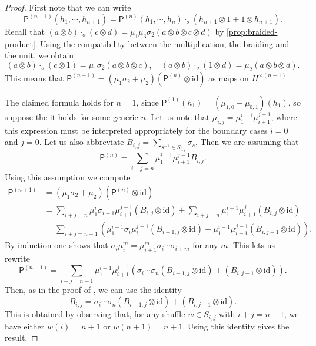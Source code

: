 \documentclass[a4paper, 12pt, reqno, english]{amsart}
\numberwithin{equation}{section}
\numberwithin{figure}{section}
\theoremstyle{plain}
\theoremstyle{plain}
\theoremstyle{plain}
\theoremstyle{plain}
\theoremstyle{plain}
\theoremstyle{definition}
\theoremstyle{definition}
\theoremstyle{definition}
\theoremstyle{remark}
\theoremstyle{definition}
\theoremstyle{definition}
\newcommand{\id}{\mathrm{id}}
\newcommand{\pmap}{\mathsf{P}}
\begin{document}
\begin{proof}
First note that we can write
\[
\pmap^{(n + 1)} (h_1, \cdots, h_{n + 1}) = \pmap^{(n)}(h_1, \cdots, h_n) \cdot_\sigma (h_{n + 1} \otimes 1 + 1 \otimes h_{n + 1}).
\]
Recall that $(a \otimes b) \cdot_\sigma (c \otimes d) = \mu_1 \mu_3 \sigma_2 (a \otimes b \otimes c \otimes d)$ by \cref{prop:braided-product}.
Using the compatibility between the multiplication, the braiding and the unit, we obtain
\[
(a \otimes b) \cdot_\sigma (c \otimes 1) = \mu_1 \sigma_2 (a \otimes b \otimes c), \quad
(a \otimes b) \cdot_\sigma (1 \otimes d) = \mu_2 (a \otimes b \otimes d).
\]
This means that $\pmap^{(n + 1)} = (\mu_1 \sigma_2 + \mu_2)(\pmap^{(n)} \otimes \id)$ as maps on $H^{\times (n + 1)}$.

The claimed formula holds for $n = 1$, since $\pmap^{(1)}(h_1) = (\mu_{1, 0} + \mu_{0, 1})(h_1)$, so suppose the it holds for some generic $n$.
Let us note that $\mu_{i, j} = \mu_1^{i - 1} \mu_{i + 1}^{j - 1}$, where this expression must be interpreted appropriately for the boundary cases $i = 0$ and $j = 0$.
Let us also abbreviate $B_{i, j} = \sum_{s^{-1} \in S_{i, j}} \sigma_s$.
Then we are assuming that
\[
\pmap^{(n)} = \sum_{i + j = n} \mu_1^{i - 1} \mu_{i + 1}^{j - 1} B_{i, j}.
\]
Using this assumption we compute
\[
\begin{split}
\pmap^{(n + 1)}
& = (\mu_1 \sigma_2 + \mu_2)(\pmap^{(n)} \otimes \id) \\
& = \sum_{i + j = n} \mu_1^i \sigma_{i + 1} \mu_{i + 1}^{j - 1} (B_{i, j} \otimes \id) + \sum_{i + j = n} \mu_1^{i - 1} \mu_{i + 1}^j (B_{i, j} \otimes \id) \\
& = \sum_{i + j = n + 1} \left( \mu_1^{i - 1} \sigma_i \mu_i^{j - 1} (B_{i - 1, j} \otimes \id) + \mu_1^{i - 1} \mu_{i + 1}^{j - 1} (B_{i, j - 1} \otimes \id) \right).
\end{split}
\]
By induction one shows that $\sigma_i \mu_i^m = \mu_{i + 1}^m \sigma_i \cdots \sigma_{i + m}$ for any $m$.
This lets us rewrite
\[
\pmap^{(n + 1)} = \sum_{i + j = n + 1} \mu_1^{i - 1} \mu_{i + 1}^{j - 1} \left( \sigma_i \cdots \sigma_n (B_{i - 1, j} \otimes \id) + (B_{i, j - 1} \otimes \id) \right).
\]
Then, as in the proof of \cite[Proposition 6]{rosso}, we can use the identity
\[
B_{i, j} = \sigma_i \cdots \sigma_n (B_{i - 1, j} \otimes \id) + (B_{i, j - 1} \otimes \id).
\]
This is obtained by observing that, for any shuffle $w \in S_{i, j}$ with $i + j = n + 1$, we have either $w(i) = n + 1$ or $w(n + 1) = n + 1$.
Using this identity gives the result.
\end{proof}
\end{document}
